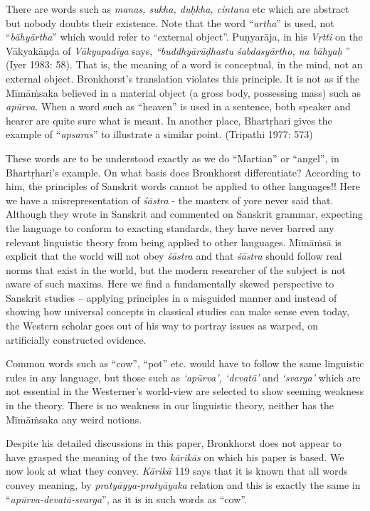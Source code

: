 There are words such as \textit{manas, sukha, duḥkha, cintana} etc which are abstract but nobody doubts their existence. Note that the word “\textit{artha}” is used, not “\textit{bāhyārtha}” which would refer to “external object”. Puṇyarāja, in his \textit{Vṛtti} on the {Vākyakāṇḍa} of \textit{Vākyapadīya} says, \textit{“buddhyārūḍhastu śabdasyārtho, na bāhyaḥ} ” (Iyer 1983: 58). That is, the meaning of a word is conceptual, in the mind, not an external object. Bronkhorst’s translation violates this principle. It is not as if the Mīmāṁsaka believed in a material object (a gross body, possessing mass) such as \textit{apūrva}. When a word such as “heaven” is used in a sentence, both speaker and hearer are quite sure what is meant. In another place, Bhartṛhari gives the example of “\textit{apsaras}” to illustrate a similar point. (Tripathi 1977: 573)

These words are to be understood exactly as we do “Martian” or “angel”, in Bhartṛhari’s example. On what basis does Bronkhorst differentiate? According to him, the principles of Sanskrit words cannot be applied to other languages!! Here we have a misrepresentation of \textit{śāstra} - the masters of yore never said that. Although they wrote in Sanskrit and commented on Sanskrit grammar, expecting the language to conform to exacting standards, they have never barred any relevant linguistic theory from being applied to other languages. Mīmāṁsā is explicit that the world will not obey \textit{śāstra} and that \textit{śāstra} should follow real norms that exist in the world, but the modern researcher of the subject is not aware of such maxims. Here we find a fundamentally skewed perspective to Sanskrit studies – applying principles in a misguided manner and instead of showing how universal concepts in classical studies can make sense even today, the Western scholar goes out of his way to portray issues as warped, on artificially constructed evidence.

Common words such as “cow”, “pot” etc. would have to follow the same linguistic rules in any language, but those such as \textit{`apūrva', `devatā'} and \textit{`svarga'} which are not essential in the Westerner’s world-view are selected to show seeming weakness in the theory. There is no weakness in our linguistic theory, neither has the {Mīmāṁsaka} any weird notions.

Despite his detailed discussions in this paper, Bronkhorst does not appear to have grasped the meaning of the two \textit{kārikās} on which his paper is based. We now look at what they convey. \textit{Kārikā} 119 says that it is known that all words convey meaning, by \textit{pratyāyya-pratyāyaka} relation and this is exactly the same in “\textit{apūrva-devatā-svarga}”, as it is in such words as “cow”.

